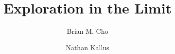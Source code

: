 \documentclass{article}
\begin{document}
%

%


\title{Exploration in the Limit}
\author[1]{Brian M. Cho}
\author[1,2]{Nathan Kallus}
\date{}

\maketitle

\end{document}
